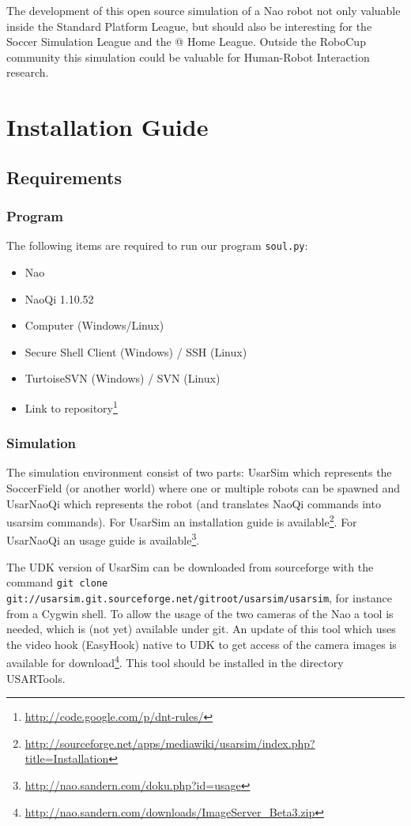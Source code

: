 \documentclass[11pt,a4paper,oneside]{article}
\begin{document}
The development of this open source simulation of a Nao robot not only valuable inside the Standard Platform League, but should also be interesting for the Soccer Simulation League and the @ Home League. Outside the RoboCup community this simulation could be valuable for Human-Robot Interaction research.


\section{Installation Guide}
\subsection{Requirements}
\subsubsection{Program}
The following items are required to run our program \texttt{soul.py}:
\begin{itemize}
\item Nao
\item NaoQi 1.10.52
\item Computer (Windows/Linux)
\item Secure Shell Client (Windows) / SSH (Linux)
\item TurtoiseSVN (Windows) / SVN (Linux)
\item Link to repository\footnote{\url{http://code.google.com/p/dnt-rules/}}
\end{itemize}

\subsubsection{Simulation}
The simulation environment consist of two parts: UsarSim which represents the SoccerField (or another world) where one or multiple robots can be spawned and UsarNaoQi which represents the robot (and translates NaoQi commands into usarsim commands).
For UsarSim an installation guide is available\footnote{\url{http://sourceforge.net/apps/mediawiki/usarsim/index.php?title=Installation}}. For UsarNaoQi an usage guide is available\footnote{\url{http://nao.sandern.com/doku.php?id=usage}}.

The UDK version of UsarSim can be downloaded from sourceforge with the command \texttt{git clone git://usarsim.git.sourceforge.net/gitroot/usarsim/usarsim}, for instance from a Cygwin shell. To allow the usage of the two cameras of the Nao a tool is needed, which is (not yet) available
under git. An update of this tool which uses the video hook (EasyHook) native to UDK to get access of the camera images is available for download\footnote{\url{http://nao.sandern.com/downloads/ImageServer_Beta3.zip}}. This tool should be installed in the directory USARTools.
\end{document}
